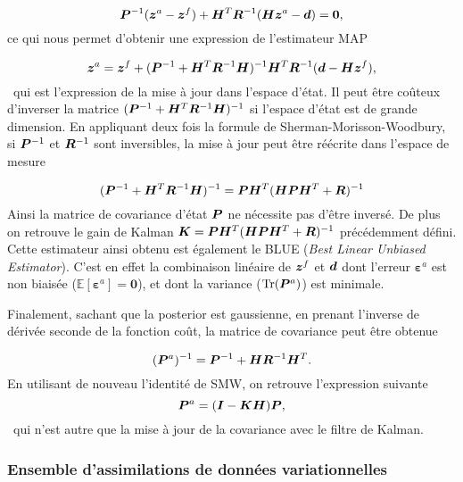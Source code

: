 \begin{equation*}
    \bm{P}^{-1} (\bm z^a - \bm z^f) + \bm{H}^T \bm{R}^{-1}(\bm{H} \bm z^a - \bm d) = \bm 0,
\end{equation*}ce qui nous permet d'obtenir une expression de l'estimateur MAP

\begin{equation*}
    \bm z^a = \bm z^f + (\bm{P}^{-1} + \bm{H}^T \bm{R}^{-1} \bm{H})^{-1} \bm{H}^T \bm{R}^{-1} (\bm{d} - \bm{H} \bm z^f),
\end{equation*}~qui est l'expression de la mise à jour dans l'espace d'état. Il peut être coûteux d'inverser la matrice $(\bm{P}^{-1} + \bm{H}^T \bm{R}^{-1} \bm{H})^{-1}$ si l'espace d'état est de grande dimension. En appliquant deux fois la formule de Sherman-Morisson-Woodbury, si $\bm{P}^{-1}$ et $\bm{R}^{-1}$ sont inversibles, la mise à jour peut être réécrite dans l'espace de mesure

\begin{equation*}
    (\bm{P}^{-1} + \bm{H}^T \bm{R}^{-1} \bm{H})^{-1} = \bm{P} \bm{H}^T (\bm{H} \bm{P} \bm{H}^T + \bm{R})^{-1}
\end{equation*}Ainsi la matrice de covariance d'état $\bm{P}$ ne nécessite pas d'être inversé. De plus on retrouve le gain de Kalman $\bm{K} = \bm{P} \bm{H}^T (\bm{H} \bm{P} \bm{H}^T + \bm{R})^{-1}$ précédemment défini. Cette estimateur ainsi obtenu est également le BLUE (\textit{Best Linear Unbiased Estimator}). C'est en effet la combinaison linéaire de $\bm z^f$ et $\bm{d}$ dont l'erreur $\bm \varepsilon^a$ est non biaisée ($\mathbb{E}[\bm \varepsilon^a] = \bm 0$), et dont la variance ($\operatorname{Tr}(\bm{P}^a)$) est minimale.

Finalement, sachant que la posterior est gaussienne, en prenant l'inverse de dérivée seconde de la fonction coût, la matrice de covariance peut être obtenue

\begin{equation*}
    (\bm{P}^a)^{-1} = \bm{P}^{-1} + \bm{H} \bm{R}^{-1} \bm{H}^T.
\end{equation*}En utilisant de nouveau l'identité de SMW, on retrouve l'expression suivante
\begin{equation*}
    \bm{P}^a = (\bm{I} - \bm{K} \bm{H}) \bm{P},
\end{equation*}~qui n'est autre que la mise à jour de la covariance avec le filtre de Kalman.

\subsubsection{Ensemble d'assimilations de données variationnelles}%

